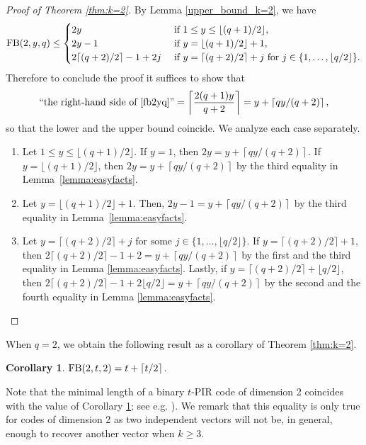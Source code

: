 \documentclass[11pt,a4paper]{article}
\theoremstyle{definition}
\newtheorem{corollary}[theorem]{Corollary}
\newcommand{\fb}{\textnormal{FB}}
\begin{document}
\begin{proof} [Proof of Theorem \ref{thm:k=2}]
By Lemma \ref{upper_bound_k=2}, we have 
\begin{equation}
\label{fb2yq}
\fb(2,y,q) \le \begin{cases}
        2y & \textnormal{ if } 1 \le y \le \lfloor (q+1)/2 \rfloor,\\
        2y-1 & \textnormal{ if } y =\lfloor (q+1)/2 \rfloor +1, \,\\
        2\lceil (q+2)/2 \rceil-1+2j & \textnormal{ if } y=\lceil (q+2)/2 \rceil + j \mbox{ for }j \in\{1,\ldots,\lfloor q/2 \rfloor\}.
    \end{cases}
\end{equation}
Therefore  to conclude the proof it suffices to show that
\begin{equation*}
\mbox{``the right-hand side of \eqref{fb2yq}''} = \left\lceil \frac{2(q+1)y}{q+2} \right\rceil = y + \left\lceil qy/(q+2) \right\rceil,
\end{equation*} so that the lower and the upper bound coincide. We analyze each case separately.
\begin{enumerate}
    \item Let $1 \le y \le \lfloor (q+1)/2 \rfloor$. If $y=1$, then $2y = y + \left\lceil qy/(q+2) \right\rceil$. If $y=\lfloor (q+1)/2 \rfloor$, then $2y = y + \left\lceil qy/(q+2) \right\rceil$ by the third equality in Lemma~\ref{lemma:easyfacts}.
    \item Let $y =\lfloor (q+1)/2 \rfloor +1.$ Then, $2y-1 = y + \left\lceil qy/(q+2) \right\rceil$ by the third equality in Lemma~\ref{lemma:easyfacts}.
    \item Let $y=\lceil (q+2)/2 \rceil + j \mbox{ for some }j \in\{1,\ldots,\lfloor q/2 \rfloor\}.$ If $y = \lceil (q+2)/2 \rceil + 1$, then $2\lceil (q+2)/2 \rceil-1+2 = y + \left\lceil qy/(q+2) \right\rceil$ by the first and the third equality in Lemma \ref{lemma:easyfacts}. Lastly, if $y = \lceil (q+2)/2 \rceil + \lfloor q/2 \rfloor$, then $2\lceil (q+2)/2 \rceil-1+2\lfloor q/2 \rfloor = y + \left\lceil qy/(q+2) \right\rceil$ by the second and the fourth equality in Lemma \ref{lemma:easyfacts}. \qedhere
\end{enumerate}
\end{proof}

When $q=2$, we obtain the following result as a corollary of Theorem \ref{thm:k=2}.

\begin{corollary}
\label{cor:(k,q)=(2,2)}
$\fb(2,t,2) = t + \lceil t/2 \rceil$. 
\end{corollary}
Note that the minimal length of a binary $t$-PIR code of dimension 2 coincides with the value of Corollary \ref{cor:(k,q)=(2,2)}; see e.g. \cite{fazeli2015pir}). We remark that this equality is only true for codes of dimension 2 as two independent vectors will not be, in general, enough to recover another vector when $k \ge 3.$ 
\end{document}

